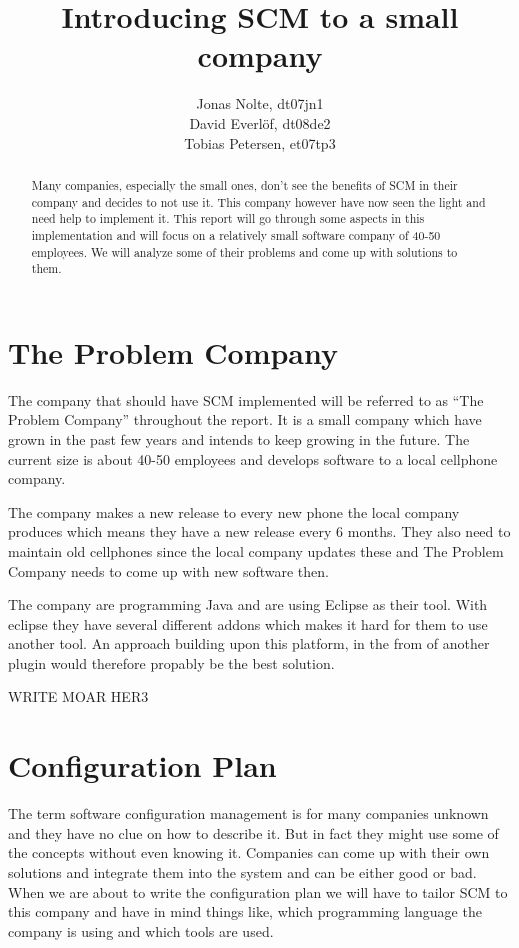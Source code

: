 \documentclass[a4paper,10pt]{article}
\title{Introducing SCM to a small company}
\author{Jonas Nolte, dt07jn1\\
David Everlöf, dt08de2\\
Tobias Petersen, et07tp3}
\begin{document}
\maketitle

\begin{abstract}

Many companies, especially the small ones, don't see the benefits of SCM in their company and decides to not use it.
This company however have now seen the light and need help to implement it.
This report will go through some aspects in this implementation and will focus on a relatively small software company of 40-50 employees.
We will analyze some of their problems and come up with solutions to them.


\end{abstract}

\section{The Problem Company}

The company that should have SCM implemented will be referred to as “The Problem Company” throughout the report.
It is a small company which have grown in the past few years and intends to keep growing in the future. The current size is about 40-50 employees and develops software to a local cellphone company.

The company makes a new release to every new phone the local company produces which means they have a new release every 6 months.
They also need to maintain old cellphones since the local company updates these and The Problem Company needs to come up with new software then.

The company are programming Java and are using Eclipse as their tool.
With eclipse they have several different addons which makes it hard for them to use another tool. An approach building upon this platform, in the from of another plugin would therefore propably be the best solution.

WRITE MOAR HER3

\section{Configuration Plan}

The term software configuration management is for many companies unknown and they have no clue on how to describe it.
But in fact they might use some of the concepts without even knowing it.
Companies can come up with their own solutions and integrate them into the system and can be either good or bad. When we are about to write the configuration plan we will have to tailor SCM to this company and have in mind things like, which programming language the company is using and which tools are used.
\end{document}
